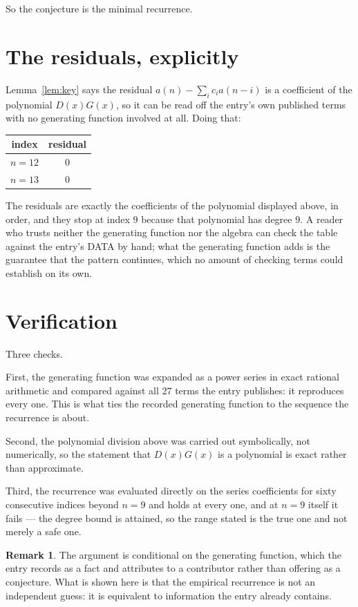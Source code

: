 \documentclass[11pt,a4paper]{article}
\theoremstyle{plain}
\theoremstyle{definition}
\newtheorem{remark}[theorem]{Remark}
\begin{document}
So the conjecture is the minimal recurrence.

\section{The residuals, explicitly}

Lemma~\ref{lem:key} says the residual $a(n)-\sum_ic_ia(n-i)$ is a coefficient of the
polynomial $D(x)G(x)$, so it can be read off the entry's own published terms with no
generating function involved at all. Doing that:
\begin{center}
\begin{tabular}{cc}
index & residual \\ \hline
$n=12$ & $0$ \\
$n=13$ & $0$
\end{tabular}
\end{center}
The residuals are exactly the coefficients of the polynomial displayed above, in order, and
they stop at index $9$ because that polynomial has degree $9$. A reader who trusts
neither the generating function nor the algebra can check the table against the entry's DATA
by hand; what the generating function adds is the guarantee that the pattern continues, which
no amount of checking terms could establish on its own.

\section{Verification}

Three checks.

First, the generating function was expanded as a power series in exact rational arithmetic and
compared against all $27$ terms the entry publishes: it reproduces every one. This is
what ties the recorded generating function to the sequence the recurrence is about.

Second, the polynomial division above was carried out symbolically, not numerically, so the
statement that $D(x)G(x)$ is a polynomial is exact rather than approximate.

Third, the recurrence was evaluated directly on the series coefficients for sixty consecutive
indices beyond $n=9$ and holds at every one, and at $n=9$ itself it fails --- the
degree bound is attained, so the range stated is the true one and not merely a safe one.

\begin{remark}
The argument is conditional on the generating function, which the entry records as a fact and
attributes to a contributor rather than offering as a conjecture. What is shown here is that
the empirical recurrence is not an independent guess: it is equivalent to information the
entry already contains.
\end{remark}
\end{document}
